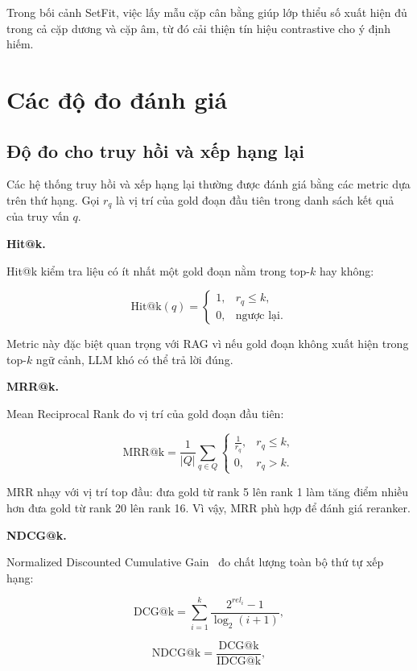 \documentclass[../DoAn.tex]{subfiles}
\begin{document}
Trong bối cảnh SetFit, việc lấy mẫu cặp cân bằng giúp lớp thiểu số xuất hiện đủ trong cả cặp dương và cặp âm, từ đó cải thiện tín hiệu contrastive cho ý định hiếm.

\section{Các độ đo đánh giá}
\label{section:2.7}

\subsection{Độ đo cho truy hồi và xếp hạng lại}
\label{subsection:2.7.1}

Các hệ thống truy hồi và xếp hạng lại thường được đánh giá bằng các metric dựa trên thứ hạng. Gọi $r_q$ là vị trí của gold đoạn đầu tiên trong danh sách kết quả của truy vấn $q$.

\noindent\textbf{Hit@k.}

Hit@k kiểm tra liệu có ít nhất một gold đoạn nằm trong top-$k$ hay không:

\[
\mathrm{Hit@k}(q)
=
\begin{cases}
1, & r_q \le k,\\
0, & \text{ngược lại}.
\end{cases}
\]

Metric này đặc biệt quan trọng với RAG vì nếu gold đoạn không xuất hiện trong top-$k$ ngữ cảnh, LLM khó có thể trả lời đúng.

\noindent\textbf{MRR@k.}

Mean Reciprocal Rank đo vị trí của gold đoạn đầu tiên:

\[
\mathrm{MRR@k}
=
\frac{1}{|Q|}
\sum_{q\in Q}
\begin{cases}
\frac{1}{r_q}, & r_q \le k,\\
0, & r_q > k.
\end{cases}
\]

MRR nhạy với vị trí top đầu: đưa gold từ rank 5 lên rank 1 làm tăng điểm nhiều hơn đưa gold từ rank 20 lên rank 16. Vì vậy, MRR phù hợp để đánh giá reranker.

\noindent\textbf{NDCG@k.}

Normalized Discounted Cumulative Gain~\cite{jarvelin2002ndcg} đo chất lượng toàn bộ thứ tự xếp hạng:

\[
\mathrm{DCG@k}
=
\sum_{i=1}^{k}
\frac{2^{rel_i}-1}{\log_2(i+1)},
\]

\[
\mathrm{NDCG@k}
=
\frac{\mathrm{DCG@k}}{\mathrm{IDCG@k}},
\]
\end{document}
